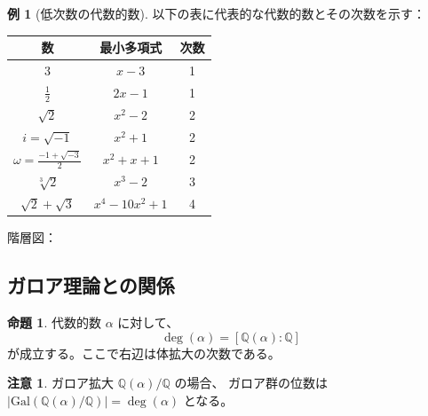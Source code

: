 \documentclass[a4paper,12pt]{ltjsarticle}
\theoremstyle{definition}
\newtheorem{example}[definition]{例}
\newtheorem{remark}[definition]{注意}
\newtheorem{proposition}[definition]{命題}
\newcommand{\Q}{\mathbb{Q}}
\DeclareMathOperator{\layer}{layer}
\DeclareMathOperator{\deg}{deg}
\begin{document}
\begin{example}[低次数の代数的数]
以下の表に代表的な代数的数とその次数を示す：

\begin{center}
\begin{tabular}{c|c|c}
数 & 最小多項式 & 次数 \\
\hline
$3$ & $x - 3$ & 1 \\
$\frac{1}{2}$ & $2x - 1$ & 1 \\
$\sqrt{2}$ & $x^2 - 2$ & 2 \\
$i = \sqrt{-1}$ & $x^2 + 1$ & 2 \\
$\omega = \frac{-1 + \sqrt{-3}}{2}$ & $x^2 + x + 1$ & 2 \\
$\sqrt[3]{2}$ & $x^3 - 2$ & 3 \\
$\sqrt{2} + \sqrt{3}$ & $x^4 - 10x^2 + 1$ & 4 \\
\end{tabular}
\end{center}

階層図：
\begin{center}
\end{center}
\end{example}

\subsection{ガロア理論との関係}

\begin{proposition}
代数的数 $\alpha$ に対して、
\[
\deg(\alpha) = [\Q(\alpha) : \Q]
\]
が成立する。ここで右辺は体拡大の次数である。
\end{proposition}

\begin{remark}
ガロア拡大 $\Q(\alpha)/\Q$ の場合、
ガロア群の位数は $|\mathrm{Gal}(\Q(\alpha)/\Q)| = \deg(\alpha)$ となる。
\end{remark}
\end{document}
